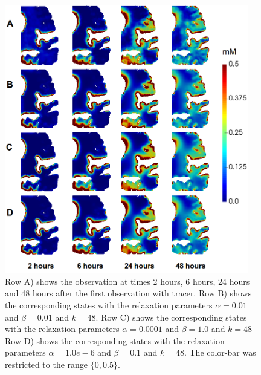 \documentclass[11pt,a4paper]{article}
\begin{document}
 



 
\begin{figure}
\centering
\includegraphics[width=0.95\textwidth]{different.png} 
\caption{Row A) shows the observation at times 2 hours, 6 hours, 24 hours and 48 hours after the first observation with tracer. Row B) shows the corresponding states with the relaxation parameters $\alpha=0.01$ and $\beta=0.01$ and $k=48$.   Row C) shows the corresponding states with the relaxation parameters $\alpha=0.0001$ and $\beta=1.0$ and $k=48$
 Row D) shows the corresponding states with the relaxation parameters $\alpha=1.0e-6$ and $\beta=0.1$ and $k=48$. The color-bar was restricted to the range $ \lbrace 0 ,0.5 \rbrace$. }
\label{Fig::realdata}
\end{figure}
\end{document}
